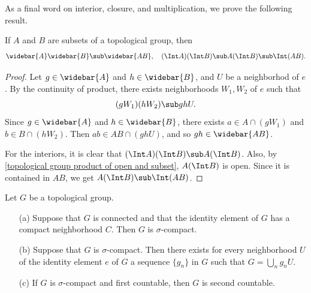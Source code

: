 As a final word on interior, closure, and multiplication, we prove the following result.
\begin{proposition}\label{topological group int and closure under product}
If $A$ and $B$ are subsets of a topological group, then
\[\widebar{A}\widebar{B}\sub\widebar{AB},\quad(\Int A)(\Int B)\sub A(\Int B)\sub\Int(AB).\]
\end{proposition}
\begin{proof}
Let $g\in\widebar{A}$ and $h\in\widebar{B}$, and $U$ be a neighborhod of $e$. By the continuity of product, there exists neighborhoods $W_1,W_2$ of $e$ such that
\[(gW_1)(hW_2)\sub ghU.\]
Since $g\in\widebar{A}$ and $h\in\widebar{B}$, there exists $a\in A\cap(gW_1)$ and $b\in B\cap(hW_2)$. Then $ab\in AB\cap(ghU)$, and so $gh\in\widebar{AB}$.\par
For the interiors, it is clear that $(\Int A)(\Int B)\sub A(\Int B)$. Also, by \cref{topological group product of open and subset}, $A(\Int B)$ is open. Since it is contained in $AB$, we get $A(\Int B)\sub\Int(AB)$.
\end{proof}
\begin{proposition}\label{topological group compactness}
Let $G$ be a topological group.
\begin{itemize}
\item[(a)] Suppose that $G$ is connected and that the identity element of $G$ has a compact neighborhood $C$. Then $G$ is $\sigma$-compact.
\item[(b)] Suppose that $G$ is $\sigma$-compact. Then there exists for every neighborhood $U$ of the identity element $e$ of $G$ a sequence $\{g_n\}$ in $G$ such that $G=\bigcup_ng_nU$.
\item[(c)] If $G$ is $\sigma$-compact and first countable, then $G$ is second countable.
\end{itemize}
\end{proposition}
